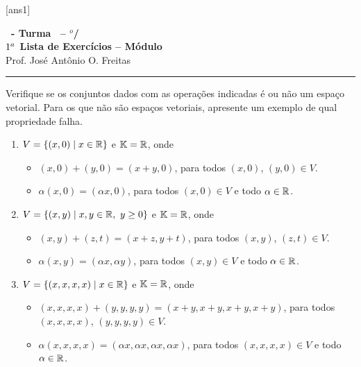 \documentclass[12pt]{exam}
\begin{document}
  [ans1]
  \begin{center}
    {\Large\bf \disciplina\ - Turma \turma\ -- \semestre$^{o}$/\ano} \\ \vspace{9pt} {\large\bf
        $1^a$ Lista de Exercícios -- Módulo \numeromodulo}\\ \vspace{9pt} Prof. José Antônio O. Freitas
  \end{center}
  \hrule


\begin{exercicio}
  Verifique se os conjuntos dados com as operações indicadas é ou não um espaço vetorial. Para os que não são espaços vetoriais, apresente um exemplo de qual propriedade falha.
  \begin{enumerate}[label={\alph*)}]
    \item $V = \{(x, 0) \mid x \in \mathbb{R}\}$ e $\mathbb{K} = \mathbb{R}$, onde
      \begin{itemize}
        \item $(x, 0) + (y, 0) = (x + y, 0)$, para todos $(x, 0)$, $(y, 0) \in V$.
        \item $\alpha(x, 0) = (\alpha x, 0)$, para todos $(x, 0) \in V$ e todo $\alpha \in \mathbb{R}$.
      \end{itemize}

    \item $V = \{(x, y) \mid x, y \in \mathbb{R},\ y \ge 0\}$ e $\mathbb{K} = \mathbb{R}$, onde
      \begin{itemize}
        \item $(x, y) + (z, t) = (x + z, y + t)$, para todos $(x, y)$, $(z, t) \in V$.
        \item $\alpha(x, y) = (\alpha x, \alpha y)$, para todos $(x, y) \in V$ e todo $\alpha \in \mathbb{R}$.
      \end{itemize}

    \item $V = \{(x, x, x, x) \mid x \in \mathbb{R}\}$ e $\mathbb{K} = \mathbb{R}$, onde
      \begin{itemize}
        \item $(x, x, x, x) + (y, y, y, y) = (x + y, x + y, x + y, x + y)$, para todos $(x, x, x, x)$, $(y, y, y, y) \in V$.
        \item $\alpha(x, x, x, x) = (\alpha x, \alpha x, \alpha x, \alpha x)$, para todos $(x, x, x, x) \in V$ e todo $\alpha \in \mathbb{R}$.
      \end{itemize}


\end{enumerate}
\end{exercicio}
\end{document}
